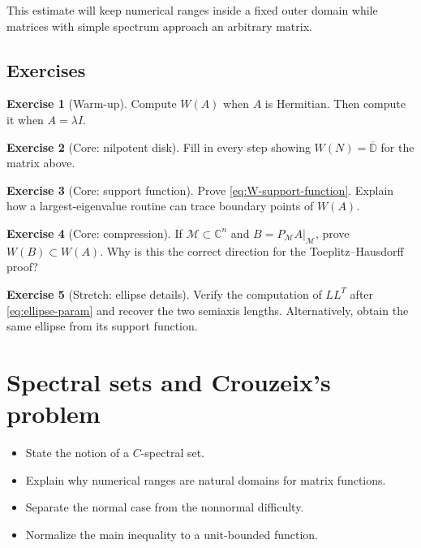 \documentclass[11pt,oneside,openany]{book}
\theoremstyle{definition}
\newtheorem{exercise}{Exercise}[chapter]
\theoremstyle{remark}
\newcommand{\C}{\mathbb C}
\newcommand{\D}{\mathbb D}
\newcommand{\olD}{\overline{\D}}
\begin{document}
This estimate will keep numerical ranges inside a fixed outer domain
while matrices with simple spectrum approach an arbitrary matrix.

\section{Exercises}

\begin{exercise}[Warm-up]
Compute \(W(A)\) when \(A\) is Hermitian.  Then compute it when
\(A=\lambda I\).
\end{exercise}

\begin{exercise}[Core: nilpotent disk]
\label{ex:nilpotent-disk}
Fill in every step showing \(W(N)=\olD\) for the matrix above.
\end{exercise}

\begin{exercise}[Core: support function]
Prove \eqref{eq:W-support-function}.  Explain how a largest-eigenvalue
routine can trace boundary points of \(W(A)\).
\end{exercise}

\begin{exercise}[Core: compression]
If \(\mathcal M\subset\C^n\) and \(B=P_{\mathcal M}A|_{\mathcal M}\),
prove \(W(B)\subset W(A)\).  Why is this the correct direction for the
Toeplitz--Hausdorff proof?
\end{exercise}

\begin{exercise}[Stretch: ellipse details]
Verify the computation of \(LL^T\) after
\eqref{eq:ellipse-param} and recover the two semiaxis lengths.
Alternatively, obtain the same ellipse from its support function.
\end{exercise}

\chapter{Spectral sets and Crouzeix's problem}
\label{ch:spectral-sets}

\begin{learninggoals}
\begin{itemize}
  \item State the notion of a \(C\)-spectral set.
  \item Explain why numerical ranges are natural domains for matrix
  functions.
  \item Separate the normal case from the nonnormal difficulty.
  \item Normalize the main inequality to a unit-bounded function.
\end{itemize}
\end{learninggoals}
\end{document}
